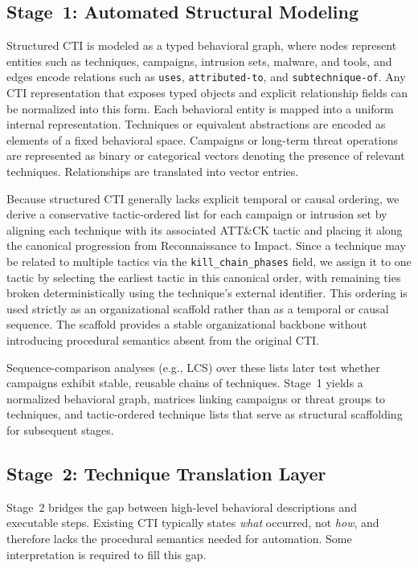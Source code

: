 \documentclass[sigconf]{acmart}
\newcommand{\attack}{ATT\&CK\xspace}
\begin{document}
\subsection{Stage~1: Automated Structural Modeling}
\label{sec:stage1}

Structured CTI is modeled as a typed behavioral graph, where nodes represent entities such as techniques, campaigns, intrusion sets, malware, and tools, and edges encode relations such as \texttt{uses}, \texttt{attributed-to}, and \texttt{subtechnique-of}. Any CTI representation that exposes typed objects and explicit relationship fields can be normalized into this form. Each behavioral entity is mapped into a uniform internal representation. Techniques or equivalent abstractions are encoded as elements of a fixed behavioral space. Campaigns or long-term threat operations are represented as binary or categorical vectors denoting the presence of relevant techniques. Relationships are translated into vector entries.

Because structured CTI generally lacks explicit temporal or causal ordering, we derive a conservative tactic-ordered list for each campaign or intrusion set by aligning each technique with its associated \attack{} tactic and placing it along the canonical progression from Reconnaissance to Impact. Since a technique may be related to multiple tactics via the \texttt{kill\_chain\_phases} field, we assign it to one tactic by selecting the earliest tactic in this canonical order, with remaining ties broken deterministically using the technique's external identifier. This ordering is used strictly as an organizational scaffold rather than as a temporal or causal sequence. The scaffold provides a stable organizational backbone without introducing procedural semantics absent from the original CTI.

Sequence-comparison analyses (e.g., LCS) over these lists later test whether campaigns exhibit stable, reusable chains of techniques. Stage~1 yields a normalized behavioral graph, matrices linking campaigns or threat groups to techniques, and tactic-ordered technique lists that serve as structural scaffolding for subsequent stages.

\subsection{Stage~2: Technique Translation Layer}
\label{sec:stage2}

Stage~2 bridges the gap between high-level behavioral descriptions and executable steps. Existing CTI typically states \emph{what} occurred, not \emph{how}, and therefore lacks the procedural semantics needed for automation. Some interpretation is required to fill this gap.
\end{document}
